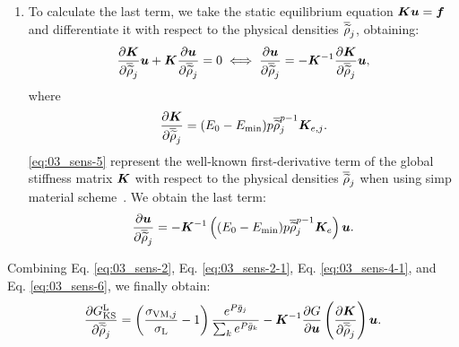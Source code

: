 \begin{enumerate}[label=\Alph* --]
    \item To calculate the last term, we take the static equilibrium equation $\bm{K}\bm{u} = \bm{f}$ and differentiate it with respect to the physical densities $\overline{\widetilde{\rho}}_j$, obtaining:
    \begin{equation}
        \frac{\partial\bm{K}}{\partial\overline{\widetilde{\rho}}_j}\bm{u} + \bm{K}\frac{\partial\bm{u}}{\partial\overline{\widetilde{\rho}}_j} = 0 \iff \frac{\partial\bm{u}}{\partial\overline{\widetilde{\rho}}_j} = -\bm{K}^{-1}\frac{\partial\bm{K}}{\partial\overline{\widetilde{\rho}}_j}\bm{u},
    \end{equation}
    where
    \begin{equation}
        \label{eq:03_sens-5}
        \frac{\partial\bm{K}}{\partial\overline{\widetilde{\rho}}_{j}} = (E_0-E_{\textrm{min}}) p\overline{\widetilde{\rho}}_j^{p-1} \bm{K}_{e,j}.
    \end{equation}
    \eqref{eq:03_sens-5} represent the well-known first-derivative term of the global stiffness matrix $\bm{K}$ with respect to the physical densities $\overline{\widetilde{\rho}}_j$ when using \gls{simp} material scheme~. We obtain the last term:
    \begin{equation} \label{eq:03_sens-6}
        \frac{\partial\bm{u} }{\partial\overline{\widetilde{\rho}}_j} = - \bm{K}^{-1} \left((E_0-E_{\textrm{min}}) p\overline{\widetilde{\rho}}_j^{p-1} \bm{K}_e \right) \bm{u}.
    \end{equation}
\end{enumerate}

Combining Eq. \ref{eq:03_sens-2}, Eq. \ref{eq:03_sens-2-1}, Eq. \ref{eq:03_sens-4-1}, and Eq. \ref{eq:03_sens-6}, we finally obtain:
\begin{equation}
\frac{\partial G_{\text{KS}}^\text{L}}{\partial\overline{\widetilde{\rho}}_j} = \left(\frac{ \sigma_{\text{VM},j}}{\sigma_\text{L}}-1 \right) \frac{e^{{P}\bar{g}_j}}{\sum_k e^{{P}\bar{g}_k}} - 
\bm{K}^{-1}\frac{\partial G}{\partial\bm{u}} \left(\frac{\partial\bm{K}}{\partial\overline{\widetilde{\rho}}_{j}} \right) \bm{u}.
\end{equation}

